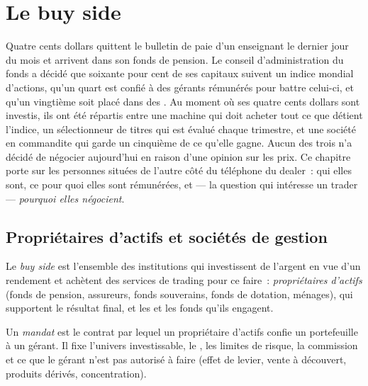 \chapter{Le buy side}\label{ch:m1:the-buy-side}

Quatre cents dollars quittent le bulletin de paie d'un enseignant le dernier jour du mois
et arrivent dans son fonds de pension. Le conseil d'administration du fonds a décidé que soixante
pour cent de ses capitaux suivent un indice mondial d'actions, qu'un quart est confié à
des gérants rémunérés pour battre celui-ci, et qu'un vingtième soit placé dans des . Au
moment où ses quatre cents dollars sont investis, ils ont été répartis entre une
machine qui doit acheter tout ce que détient l'indice, un sélectionneur de titres qui est
évalué chaque trimestre, et une société en commandite qui garde un cinquième de ce qu'elle
gagne. Aucun des trois n'a décidé de négocier aujourd'hui en raison d'une opinion sur les prix.
Ce chapitre porte sur les personnes situées de l'autre côté du téléphone du dealer~:
qui elles sont, ce pour quoi elles sont rémunérées, et --- la question
qui intéresse un trader --- \emph{pourquoi elles négocient}.

\section{Propriétaires d'actifs et sociétés de gestion}

\begin{definition}\label{def:m1:the-buy-side:buy-side}
Le \emph{buy side} est l'ensemble des institutions qui investissent
de l'argent en vue d'un rendement et achètent des services de trading pour ce faire~: \emph{propriétaires d'actifs}
(fonds de pension, assureurs, fonds souverains, fonds de dotation, ménages), qui supportent
le résultat final, et les \emph{} et les fonds qu'ils engagent.
\end{definition}

\begin{definition}[Mandat]\label{def:m1:the-buy-side:mandate}
Un \emph{mandat} est le contrat par lequel un propriétaire d'actifs
confie un portefeuille à un gérant. Il fixe l'univers investissable, le
, les limites de risque, la commission et ce que le gérant
n'est pas autorisé à faire (effet de levier, vente à découvert, produits dérivés, concentration).
\end{definition}

